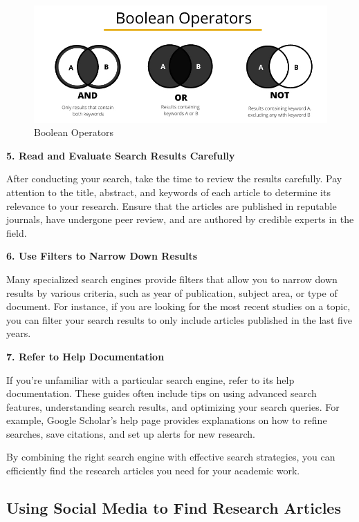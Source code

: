 \documentclass[
]{book}
\begin{document}
\begin{figure}
\centering
\includegraphics[width=1\linewidth,height=\textheight,keepaspectratio]{images/boolean.jpg}
\caption{Boolean Operators}
\end{figure}

\textbf{5. Read and Evaluate Search Results Carefully}

After conducting your search, take the time to review the results carefully. Pay attention to the title, abstract, and keywords of each article to determine its relevance to your research. Ensure that the articles are published in reputable journals, have undergone peer review, and are authored by credible experts in the field.

\textbf{6. Use Filters to Narrow Down Results}

Many specialized search engines provide filters that allow you to narrow down results by various criteria, such as year of publication, subject area, or type of document. For instance, if you are looking for the most recent studies on a topic, you can filter your search results to only include articles published in the last five years.

\textbf{7. Refer to Help Documentation}

If you're unfamiliar with a particular search engine, refer to its help documentation. These guides often include tips on using advanced search features, understanding search results, and optimizing your search queries. For example, Google Scholar's help page provides explanations on how to refine searches, save citations, and set up alerts for new research.

By combining the right search engine with effective search strategies, you can efficiently find the research articles you need for your academic work.

\subsection*{Using Social Media to Find Research Articles}\label{using-social-media-to-find-research-articles}
\end{document}
